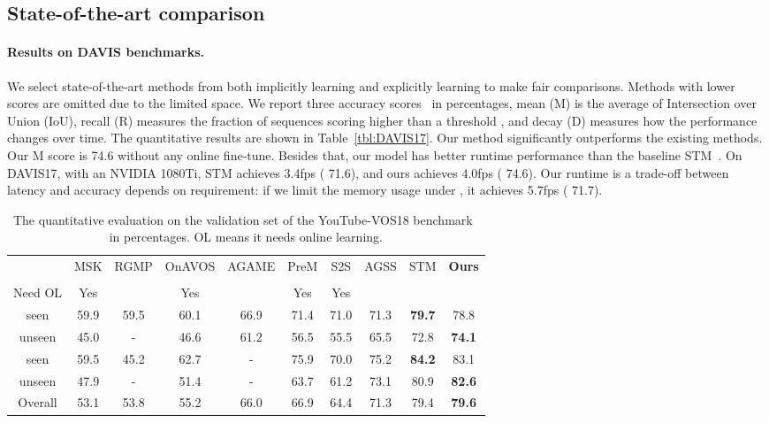 \documentclass{article}
\begin{document}
\subsection{State-of-the-art comparison}

\paragraph{Results on DAVIS benchmarks.}
We select state-of-the-art methods from both implicitly learning and explicitly learning to make fair comparisons.
Methods with lower scores are omitted due to the limited space.
We report three accuracy scores~\cite{pont-tuset_2017_2018} in percentages, mean (M) is the average of Intersection over Union (IoU), recall (R) measures the fraction of sequences scoring higher than a threshold , and decay (D) measures how the performance changes over time.
The quantitative results are shown in Table~\ref{tbl:DAVIS17}.
Our method significantly outperforms the existing methods.
Our  M score is 74.6 without any online fine-tune.
Besides that, our model has better runtime performance than the baseline STM~\cite{oh_video_2019}.
On DAVIS17, with an NVIDIA 1080Ti, STM achieves 3.4fps ( 71.6), and ours achieves 4.0fps ( 74.6). 
Our runtime is a trade-off between latency and accuracy depends on requirement: if we limit the memory usage under , it achieves 5.7fps ( 71.7).


\begin{table}
   \caption{The quantitative evaluation on the validation set of the YouTube-VOS18 benchmark~\cite{xu_youtube-vos_2018} in percentages. OL means it needs online learning.}
  \label{tbl:YV}
  \centering
  \begin{tabular}{c|ccccccccc}
        \toprule
         & MSK & RGMP & OnAVOS & AGAME & PreM & S2S & AGSS & STM & \textbf{Ours}\\
         & \cite{Perazzi2017} & \cite{oh_fast_2018} & \cite{voigtlaender17BMVC} & \cite{johnander2019generative} & \cite{luiten_premvos_2018} & \cite{xu2018youtube} & \cite{lin_agss-vos_2019} & \cite{oh_video_2019} & \\
         \midrule
         Need OL & Yes & & Yes &  & Yes & Yes & & &\\
         \midrule
         seen   & 59.9 & 59.5 & 60.1 & 66.9 & 71.4 & 71.0 & 71.3 & \textbf{79.7} & 78.8 \\
         unseen & 45.0 & -    & 46.6 & 61.2 & 56.5 & 55.5 & 65.5 & 72.8 & \textbf{74.1}\\
        \midrule
         seen   & 59.5 & 45.2 & 62.7 & -    & 75.9 & 70.0 & 75.2 & \textbf{84.2} & 83.1\\
         unseen & 47.9 & -    & 51.4 & -    & 63.7 & 61.2 & 73.1 & 80.9 & \textbf{82.6}\\
        \midrule
        Overall              & 53.1 & 53.8 & 55.2 & 66.0 & 66.9 & 64.4 & 71.3 & 79.4  & \textbf{79.6}\\
        
        \bottomrule
    \end{tabular}

\end{table}
\end{document}
